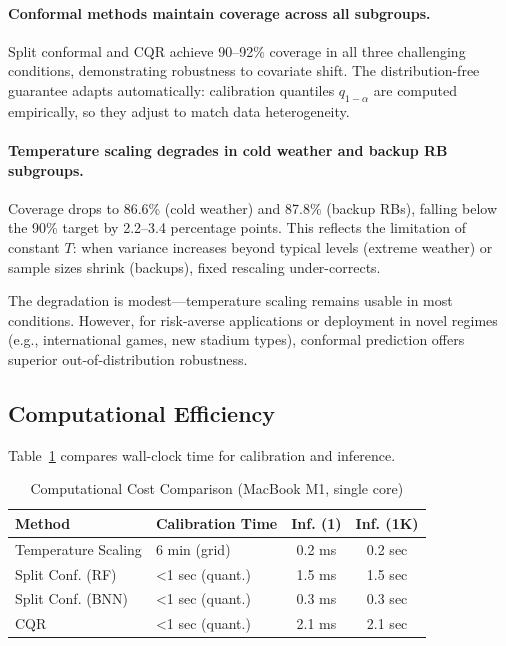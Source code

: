 
\paragraph{Conformal methods maintain coverage across all subgroups.}
Split conformal and CQR achieve 90--92\% coverage in all three challenging conditions, demonstrating robustness to covariate shift. The distribution-free guarantee adapts automatically: calibration quantiles $q_{1-\alpha}$ are computed empirically, so they adjust to match data heterogeneity.

\paragraph{Temperature scaling degrades in cold weather and backup RB subgroups.}
Coverage drops to 86.6\% (cold weather) and 87.8\% (backup RBs), falling below the 90\% target by 2.2--3.4 percentage points. This reflects the limitation of constant $T$: when variance increases beyond typical levels (extreme weather) or sample sizes shrink (backups), fixed rescaling under-corrects.

The degradation is modest—temperature scaling remains usable in most conditions. However, for risk-averse applications or deployment in novel regimes (e.g., international games, new stadium types), conformal prediction offers superior out-of-distribution robustness.

\subsection{Computational Efficiency}\label{subsec:conformal-efficiency}

Table~\ref{tab:conformal-timing} compares wall-clock time for calibration and inference.

\begin{table}[t]
\centering
\small
\caption{Computational Cost Comparison (MacBook M1, single core)}
\label{tab:conformal-timing}
\begin{tabular}{@{}lp{2.5cm}cc@{}}
\toprule
\textbf{Method} & \textbf{Calibration Time} & \textbf{Inf. (1)} & \textbf{Inf. (1K)} \\
\midrule
Temperature Scaling & 6 min (grid) & 0.2 ms & 0.2 sec \\
Split Conf. (RF) & <1 sec (quant.) & 1.5 ms & 1.5 sec \\
Split Conf. (BNN) & <1 sec (quant.) & 0.3 ms & 0.3 sec \\
CQR & <1 sec (quant.) & 2.1 ms & 2.1 sec \\
\bottomrule
\end{tabular}
\end{table}

